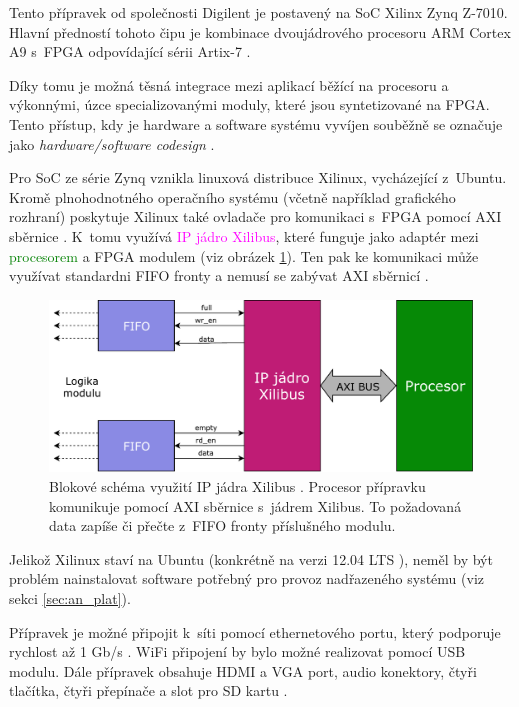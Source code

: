 Tento přípravek od společnosti Digilent je postavený na SoC Xilinx Zynq Z-7010. Hlavní předností tohoto čipu je kombinace dvoujádrového procesoru ARM Cortex A9 s~FPGA odpovídající sérii Artix-7 \cite{zybo_man}. 

Díky tomu je možná těsná integrace mezi aplikací běžící na procesoru a výkonnými, úzce specializovanými moduly, které jsou syntetizované na FPGA. Tento přístup, kdy je hardware a software systému vyvíjen souběžně se označuje jako \textit{hardware/software codesign} \cite{hw_code}.

Pro SoC ze série Zynq vznikla linuxová distribuce Xilinux, vycházející z~Ubuntu. Kromě plnohodnotného operačního systému (včetně například grafického rozhraní) poskytuje Xilinux také ovladače pro komunikaci s~FPGA pomocí AXI sběrnice \cite{xilibus}. K~tomu využívá \textcolor{magenta}{IP jádro Xilibus}, které funguje jako adaptér mezi \textcolor{green}{procesorem} a FPGA modulem (viz obrázek \ref{fig:xilibus}). Ten pak ke komunikaci může využívat standardni \textcolor{blue2}{FIFO} fronty a nemusí se zabývat AXI sběrnicí \cite{xilibus}.

\begin{figure}[h!]
    \centering
    \includegraphics[width=\textwidth]{images/xilibus.pdf}
    \caption[Blokové schéma využití IP jádra Xilibus]{Blokové schéma využití IP jádra Xilibus \cite{xilibus}. Procesor přípravku komunikuje pomocí AXI sběrnice s~jádrem Xilibus. To požadovaná data zapíše či přečte z~FIFO fronty příslušného modulu.}
    \label{fig:xilibus}
\end{figure}

Jelikož Xilinux staví na Ubuntu (konkrétně na verzi 12.04 LTS \cite{xilibus}), neměl by být problém nainstalovat software potřebný pro provoz nadřazeného systému (viz sekci \ref{sec:an_plat}). 

Přípravek je možné připojit k~síti pomocí ethernetového portu, který podporuje rychlost až 1 Gb/s \cite{zybo_man}. WiFi připojení by bylo možné realizovat pomocí USB modulu. Dále přípravek obsahuje HDMI a VGA port, audio konektory, čtyři tlačítka, čtyři přepínače a slot pro SD kartu \cite{zybo_man}.


